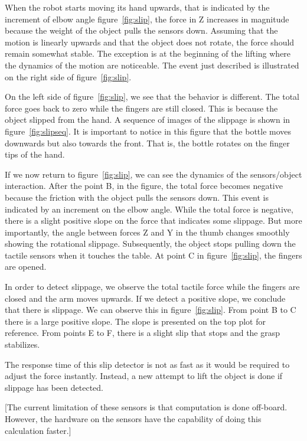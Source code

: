 When the robot starts moving its hand upwards, that is indicated
by the increment of elbow angle figure~\ref{fig:slip}, the force
in Z increases in magnitude because the weight of the object pulls
the sensors down. Assuming that the motion is linearly upwards and
that the object does not rotate, the force should remain somewhat
stable. The exception is at the beginning of the lifting where the
dynamics of the motion are noticeable. The event just described is
illustrated on the right side of figure~\ref{fig:slip}.

On the left side of figure~\ref{fig:slip}, we see that the
behavior is different. The total force goes back to zero while the
fingers are still closed. This is because the object slipped from
the hand. A sequence of images of the slippage is shown in
figure~\ref{fig:slipseq}. It is important to notice in this figure
that the bottle moves downwards but also towards the front. That
is, the bottle rotates on the finger tips of the hand.

If we now return to figure~\ref{fig:slip}, we can see the dynamics
of the sensors/object interaction. After the point B, in the
figure, the total force becomes negative because the friction with
the object pulls the sensors down. This event is indicated by an
increment on the elbow angle. While the total force is negative,
there is a slight positive slope on the force that indicates some
slippage. But more importantly, the angle between forces Z and Y
in the thumb changes smoothly showing the rotational slippage.
Subsequently, the object stops pulling down the tactile sensors
when it touches the table. At point C in figure~\ref{fig:slip},
the fingers are opened.


In order to detect slippage, we observe the total tactile force
while the fingers are closed and the arm moves upwards. If we
detect a positive slope, we conclude that there is slippage. We
can observe this in figure~\ref{fig:slip}. From point B to C there
is a large positive slope. The slope is presented on the top plot
for reference. From points E to F, there is a slight slip that
stops and the grasp stabilizes.

The response time of this slip detector is not as fast as it would
be required to adjust the force instantly. Instead, a new attempt
to lift the object is done if slippage has been detected.

[The current limitation of these sensors is that computation is
done off-board. However, the hardware on the sensors have the
capability of doing this calculation faster.]

